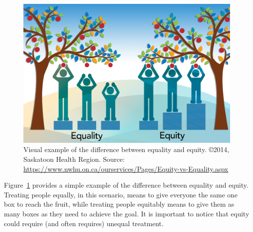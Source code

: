\begin{figure}[h!]
\includegraphics[scale=.5]{figures/equality_vs_equity.jpg}
\centering
\caption{Visual example of the difference between equality and equity.\newline
\copyright 2014, Saskatoon Health Region. Source: \upshape\protect\url{https://www.nwhu.on.ca/ourservices/Pages/Equity-vs-Equality.aspx}}
\label{fig:equality_vs_equity}
\end{figure}

Figure~\ref{fig:equality_vs_equity} provides a simple example of the difference between equality and equity. Treating people equally, in this scenario, means to give everyone the same one box to reach the fruit, while treating people equitably means to give them as many boxes as they need to achieve the goal. It is important to notice that equity could require (and often requires) unequal treatment.


